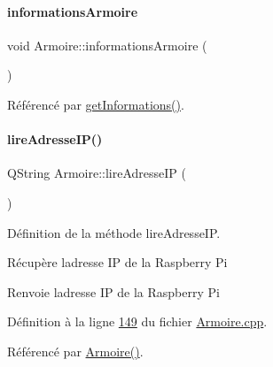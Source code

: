 \paragraph{\texorpdfstring{informations\+Armoire}{informationsArmoire}}
{\footnotesize\ttfamily void Armoire\+::informations\+Armoire (\begin{DoxyParamCaption}\item[{Q\+String\+List}]{ }\end{DoxyParamCaption})\hspace{0.3cm}{\ttfamily [signal]}}



Référencé par \hyperlink{_armoire_8cpp_source_l00078}{get\+Informations()}.

\mbox{\label{class_armoire_abc30649cc7d4f3c0cefcc54894aeb406}} 
\paragraph{\texorpdfstring{lire\+Adresse\+I\+P()}{lireAdresseIP()}}
{\footnotesize\ttfamily Q\+String Armoire\+::lire\+Adresse\+IP (\begin{DoxyParamCaption}{ }\end{DoxyParamCaption})\hspace{0.3cm}{\ttfamily [private]}}



Définition de la méthode lire\+Adresse\+IP. 

Récupère l\textquotesingle{}adresse IP de la Raspberry Pi \begin{DoxyReturn}{Renvoie}
l\textquotesingle{}adresse IP de la Raspberry Pi 
\end{DoxyReturn}


Définition à la ligne \hyperlink{_armoire_8cpp_source_l00149}{149} du fichier \hyperlink{_armoire_8cpp_source}{Armoire.\+cpp}.



Référencé par \hyperlink{_armoire_8cpp_source_l00022}{Armoire()}.


